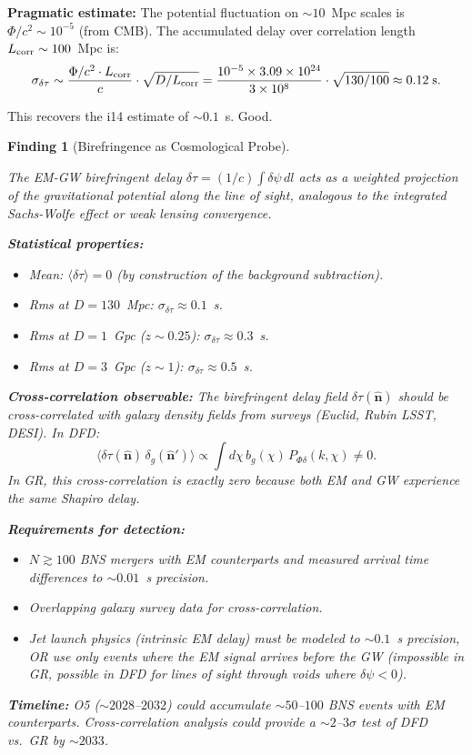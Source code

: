 \documentclass[11pt]{article}
\newtheorem{finding}{Finding}
\newcommand{\ee}[1]{\times 10^{#1}}
\begin{document}
\textbf{Pragmatic estimate:} The potential fluctuation on
$\sim 10$~Mpc scales is $\Phi/c^2 \sim 10^{-5}$ (from CMB).
The accumulated delay over correlation length $L_{\rm corr} \sim
100$~Mpc is:
\begin{equation}
\sigma_{\delta\tau} \sim \frac{\Phi/c^2 \cdot L_{\rm corr}}{c}
\cdot\sqrt{D/L_{\rm corr}}
= \frac{10^{-5}\times 3.09\ee{24}}{3\ee{8}}\cdot\sqrt{130/100}
\approx 0.12\;\text{s}.
\end{equation}

This recovers the i14 estimate of $\sim 0.1$~s. Good.

\begin{finding}[Birefringence as Cosmological Probe]\label{find:biref-cosmo}

The EM-GW birefringent delay $\delta\tau = (1/c)\int\delta\psi\,dl$
acts as a weighted projection of the gravitational potential along
the line of sight, analogous to the integrated Sachs-Wolfe effect
or weak lensing convergence.

\textbf{Statistical properties:}
\begin{itemize}[nosep]
\item Mean: $\langle\delta\tau\rangle = 0$ (by construction of the
  background subtraction).
\item Rms at $D = 130$~Mpc: $\sigma_{\delta\tau} \approx 0.1$~s.
\item Rms at $D = 1$~Gpc ($z \sim 0.25$): $\sigma_{\delta\tau}
  \approx 0.3$~s.
\item Rms at $D = 3$~Gpc ($z \sim 1$): $\sigma_{\delta\tau}
  \approx 0.5$~s.
\end{itemize}

\textbf{Cross-correlation observable:}
The birefringent delay field $\delta\tau(\hat{\mathbf{n}})$ should
be cross-correlated with galaxy density fields from surveys
(Euclid, Rubin LSST, DESI). In DFD:
\begin{equation}
\langle\delta\tau(\hat{\mathbf{n}})\,\delta_g(\hat{\mathbf{n}}')\rangle
\propto \int d\chi\,b_g(\chi)\,P_{\Phi\delta}(k,\chi) \neq 0.
\end{equation}
In GR, this cross-correlation is \emph{exactly zero} because both
EM and GW experience the same Shapiro delay.

\textbf{Requirements for detection:}
\begin{itemize}[nosep]
\item $N \gtrsim 100$ BNS mergers with EM counterparts and measured
  arrival time differences to $\sim 0.01$~s precision.
\item Overlapping galaxy survey data for cross-correlation.
\item Jet launch physics (intrinsic EM delay) must be modeled to
  $\sim 0.1$~s precision, OR use only events where the EM signal
  arrives \emph{before} the GW (impossible in GR, possible in DFD
  for lines of sight through voids where $\delta\psi < 0$).
\end{itemize}

\textbf{Timeline:} O5 ($\sim 2028$--$2032$) could accumulate
$\sim 50$--$100$ BNS events with EM counterparts. Cross-correlation
analysis could provide a $\sim 2$--$3\sigma$ test of DFD vs.\ GR
by $\sim 2033$.
\end{finding}
\end{document}
